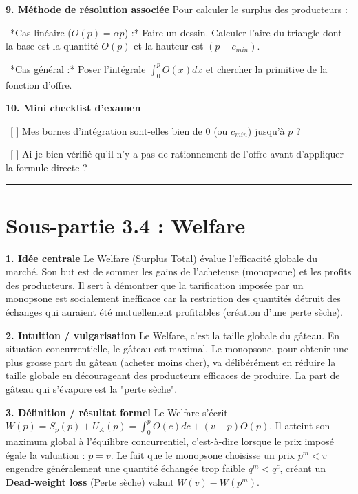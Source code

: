 \documentclass[11pt, a4paper]{report}
\begin{document}
\textbf{9. Méthode de résolution associée}
Pour calculer le surplus des producteurs :
\par \textbullet\ *Cas linéaire ($O(p) = \alpha p$) :* Faire un dessin. Calculer l'aire du triangle dont la base est la quantité $O(p)$ et la hauteur est $(p - c_{min})$.
\par \textbullet\ *Cas général :* Poser l'intégrale $\int_0^p O(x) dx$ et chercher la primitive de la fonction d'offre.

\textbf{10. Mini checklist d'examen}
\par \textbullet\ [ ] Mes bornes d'intégration sont-elles bien de $0$ (ou $c_{min}$) jusqu'à $p$ ?
\par \textbullet\ [ ] Ai-je bien vérifié qu'il n'y a pas de rationnement de l'offre avant d'appliquer la formule directe ?

\vspace{1cm}\hrule\vspace{1cm}

\section{Sous-partie 3.4 : Welfare}

\textbf{1. Idée centrale}
Le Welfare (Surplus Total) évalue l'efficacité globale du marché. Son but est de sommer les gains de l'acheteuse (monopsone) et les profits des producteurs. Il sert à démontrer que la tarification imposée par un monopsone est socialement inefficace car la restriction des quantités détruit des échanges qui auraient été mutuellement profitables (création d'une perte sèche).

\textbf{2. Intuition / vulgarisation}
Le Welfare, c'est la taille globale du gâteau. En situation concurrentielle, le gâteau est maximal. Le monopsone, pour obtenir une plus grosse part du gâteau (acheter moins cher), va délibérément en réduire la taille globale en décourageant des producteurs efficaces de produire. La part de gâteau qui s'évapore est la "perte sèche".

\textbf{3. Définition / résultat formel}
Le Welfare s'écrit $W(p) = S_p(p) + U_A(p) = \int_0^p O(c) dc + (v-p)O(p)$.
Il atteint son maximum global à l'équilibre concurrentiel, c'est-à-dire lorsque le prix imposé égale la valuation : $p = v$.
Le fait que le monopsone choisisse un prix $p^m < v$ engendre généralement une quantité échangée trop faible $q^m < q^c$, créant un \textbf{Dead-weight loss} (Perte sèche) valant $W(v) - W(p^m)$.
\end{document}
